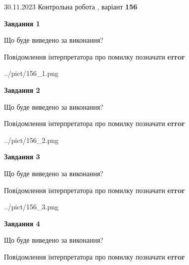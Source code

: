 \documentclass[12pt, ukrainian]{article}
\begin{document}
{{30.11.2023 Контрольна робота , варіант  \No \textbf { 156 }\par}}
{




{\begin {center}\textbf{Завдання 1}\end {center}}\par
Що буде виведено за виконання? \par
Повідомлення інтерпретатора про помилку позначати \textbf{error}

\begin{center}
	{../pict/156_1.png}
\end{center}
\newpage

{\begin {center}\textbf{Завдання 2}\end {center}}\par
Що буде виведено за виконання? \par
Повідомлення інтерпретатора про помилку позначати \textbf{error}

\begin{center}
	{../pict/156_2.png}
\end{center}
\newpage

{\begin {center}\textbf{Завдання 3}\end {center}}\par
Що буде виведено за виконання? \par
Повідомлення інтерпретатора про помилку позначати \textbf{error}

\begin{center}
	{../pict/156_3.png}
\end{center}
\newpage

{\begin {center}\textbf{Завдання 4}\end {center}}\par
Що буде виведено за виконання? \par
Повідомлення інтерпретатора про помилку позначати \textbf{error}

}
\end{document}
